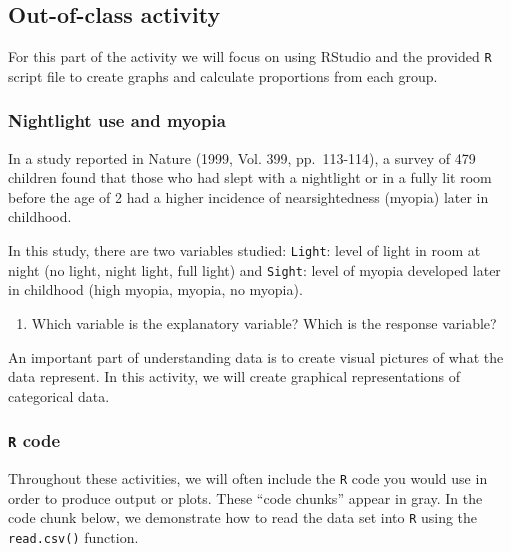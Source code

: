 \documentclass[
]{report}
\providecommand{\tightlist}{%
  \setlength{\itemsep}{0pt}\setlength{\parskip}{0pt}}
\begin{document}
\newpage

\hypertarget{out-of-class-activity-2}{%
\subsection{Out-of-class activity}\label{out-of-class-activity-2}}

For this part of the activity we will focus on using RStudio and the provided \texttt{R} script file to create graphs and calculate proportions from each group.

\hypertarget{nightlight-use-and-myopia}{%
\subsubsection{Nightlight use and myopia}\label{nightlight-use-and-myopia}}

In a study reported in Nature (1999, Vol. 399, pp.~113-114), a survey of 479 children found that those who had slept with a nightlight or in a fully lit room before the age of 2 had a higher incidence of nearsightedness (myopia) later in childhood.

In this study, there are two variables studied: \texttt{Light}: level of light in room at night (no light, night light, full light) and \texttt{Sight}: level of myopia developed later in childhood (high myopia, myopia, no myopia).

\begin{enumerate}
\def\labelenumi{\arabic{enumi}.}
\tightlist
\item
  Which variable is the explanatory variable? Which is the response variable?
\end{enumerate}

\vspace{0.8in}

An important part of understanding data is to create visual pictures of what the data represent. In this activity, we will create graphical representations of categorical data.

\hypertarget{r-code}{%
\subsubsection*{\texorpdfstring{\texttt{R} code}{R code}}\label{r-code}}

Throughout these activities, we will often include the \texttt{R} code
you would use in order to produce output or plots. These
``code chunks'' appear in gray. In the code chunk below, we
demonstrate how to read the data set into \texttt{R} using the \texttt{read.csv()} function.
\end{document}
